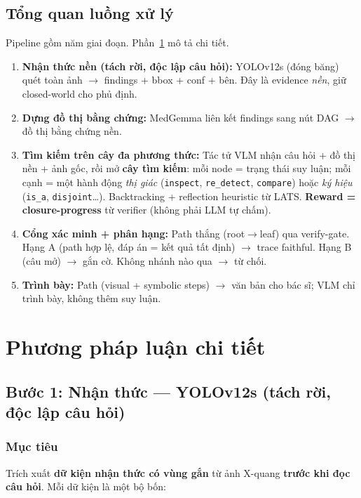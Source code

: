 \documentclass[11pt,a4paper]{article}
\begin{document}
\subsection{Tổng quan luồng xử lý}

Pipeline gồm năm giai đoạn. Phần~\ref{sec:methodology} mô tả chi tiết.

\begin{enumerate}[leftmargin=1.5em]
  \item \textbf{Nhận thức nền (tách rời, độc lập câu hỏi):} YOLOv12s (đóng băng) quét toàn ảnh $\to$ findings + bbox + conf + bên. Đây là evidence \emph{nền}, giữ closed-world cho phủ định.
  \item \textbf{Dựng đồ thị bằng chứng:} MedGemma liên kết findings sang nút DAG $\to$ đồ thị bằng chứng nền.
  \item \textbf{Tìm kiếm trên cây đa phương thức:} Tác tử VLM nhận câu hỏi + đồ thị nền + ảnh gốc, rồi mở \textbf{cây tìm kiếm}: mỗi node = trạng thái suy luận; mỗi cạnh = một hành động \emph{thị giác} (\texttt{inspect}, \texttt{re\_detect}, \texttt{compare}) hoặc \emph{ký hiệu} (\texttt{is\_a}, \texttt{disjoint}\ldots). Backtracking + reflection heuristic từ LATS. \textbf{Reward = closure-progress} từ verifier (không phải LLM tự chấm).
  \item \textbf{Cổng xác minh + phân hạng:} Path thắng (root$\to$leaf) qua verify-gate. Hạng A (path hợp lệ, đáp án = kết quả tất định) $\to$ trace faithful. Hạng B (câu mở) $\to$ gắn cờ. Không nhánh nào qua $\to$ từ chối.
  \item \textbf{Trình bày:} Path (visual + symbolic steps) $\to$ văn bản cho bác sĩ; VLM chỉ trình bày, không thêm suy luận.
\end{enumerate}

\section{Phương pháp luận chi tiết}
\label{sec:methodology}

\subsection{Bước 1: Nhận thức --- YOLOv12s (tách rời, độc lập câu hỏi)}

\subsubsection{Mục tiêu}
Trích xuất \textbf{dữ kiện nhận thức có vùng gắn} từ ảnh X-quang \textbf{trước khi đọc câu hỏi}. Mỗi dữ kiện là một bộ bốn:
\end{document}
